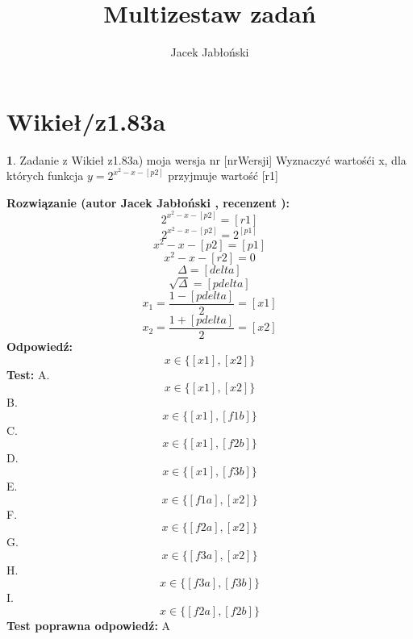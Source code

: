 \documentclass[12pt, a4paper]{article}
\title{Multizestaw zadań}
\author{Jacek Jabłoński}
\date{}
\theoremstyle{definition} %
\newtheorem{zad}{}
\newcommand{\kategoria}[1]{\section{#1}} %
\newcommand{\zadStart}[1]{\begin{zad}#1\newline} %
\newcommand{\zadStop}{\end{zad}}   %
\newcommand{\rozwStart}[2]{\noindent \textbf{Rozwiązanie (autor #1 , recenzent #2): }\newline} %
\newcommand{\rozwStop}{\newline}                                            %
\newcommand{\odpStart}{\noindent \textbf{Odpowiedź:}\newline}    %
\newcommand{\odpStop}{\newline}                                             %
\newcommand{\testStart}{\noindent \textbf{Test:}\newline} %
\newcommand{\testStop}{\newline} %
\newcommand{\kluczStart}{\noindent \textbf{Test poprawna odpowiedź:}\newline} %
\newcommand{\kluczStop}{\newline} %
\begin{document}
\maketitle


\kategoria{Wikieł/z1.83a}
\zadStart{Zadanie z Wikieł z1.83a) moja wersja nr [nrWersji]}
Wyznaczyć wartośći x, dla których funkcja $y=2^{x^2-x-[p2]}$ przyjmuje wartość [r1]
\zadStop
\rozwStart{Jacek Jabłoński}{}
$$2^{x^2-x-[p2]} = [r1] $$
$$2^{x^2-x-[p2]} = 2^{[p1]}$$
$$x^2-x-[p2] = [p1]$$
$$x^2-x-[r2] = 0$$
$$\Delta = [delta]$$
$$\sqrt{\Delta} = [pdelta]$$
$$x_1 = \frac{1 - [pdelta]}{2} = [x1]$$
$$x_2 = \frac{1 + [pdelta]}{2} = [x2]$$
\rozwStop
\odpStart
$$x \in \{[x1],[x2]\}$$
\odpStop
\testStart
A. $$x \in \{[x1],[x2]\}$$
B. $$x \in \{[x1],[f1b]\}$$
C. $$x \in \{[x1],[f2b]\}$$
D. $$x \in \{[x1],[f3b]\}$$
E. $$x \in \{[f1a],[x2]\}$$
F. $$x \in \{[f2a],[x2]\}$$
G. $$x \in \{[f3a],[x2]\}$$
H. $$x \in \{[f3a],[f3b]\}$$
I. $$x \in \{[f2a],[f2b]\}$$
\testStop
\kluczStart
A
\kluczStop
\end{document}
